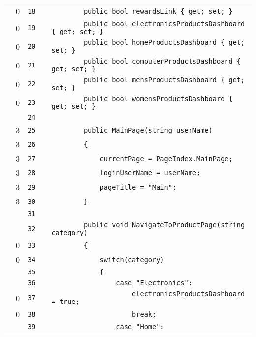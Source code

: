 \documentclass[a4paper,landscape,10pt]{article}
\begin{document}
\begin{longtable}[l]{lrrll}
\cellcolor{red} & 0 & \verb~18~ & & \verb~        public bool rewardsLink { get; set; }~\\
\cellcolor{red} & 0 & \verb~19~ & & \verb~        public bool electronicsProductsDashboard { get; set; }~\\
\cellcolor{red} & 0 & \verb~20~ & & \verb~        public bool homeProductsDashboard { get; set; }~\\
\cellcolor{red} & 0 & \verb~21~ & & \verb~        public bool computerProductsDashboard { get; set; }~\\
\cellcolor{red} & 0 & \verb~22~ & & \verb~        public bool mensProductsDashboard { get; set; }~\\
\cellcolor{red} & 0 & \verb~23~ & & \verb~        public bool womensProductsDashboard { get; set; }~\\
\cellcolor{gray} &  & \verb~24~ & & \verb~~\\
\cellcolor{green} & 3 & \verb~25~ & & \verb~        public MainPage(string userName)~\\
\cellcolor{green} & 3 & \verb~26~ & & \verb~        {~\\
\cellcolor{green} & 3 & \verb~27~ & & \verb~            currentPage = PageIndex.MainPage;~\\
\cellcolor{green} & 3 & \verb~28~ & & \verb~            loginUserName = userName;~\\
\cellcolor{green} & 3 & \verb~29~ & & \verb~            pageTitle = "Main";~\\
\cellcolor{green} & 3 & \verb~30~ & & \verb~        }~\\
\cellcolor{gray} &  & \verb~31~ & & \verb~~\\
\cellcolor{gray} &  & \verb~32~ & & \verb~        public void NavigateToProductPage(string category)~\\
\cellcolor{red} & 0 & \verb~33~ & & \verb~        {~\\
\cellcolor{red} & 0 & \verb~34~ & & \verb~            switch(category)~\\
\cellcolor{gray} &  & \verb~35~ & & \verb~            {~\\
\cellcolor{gray} &  & \verb~36~ & & \verb~                case "Electronics":~\\
\cellcolor{red} & 0 & \verb~37~ & & \verb~                    electronicsProductsDashboard = true;~\\
\cellcolor{red} & 0 & \verb~38~ & & \verb~                    break;~\\
\cellcolor{gray} &  & \verb~39~ & & \verb~                case "Home":~\\

\end{longtable}
\end{document}
